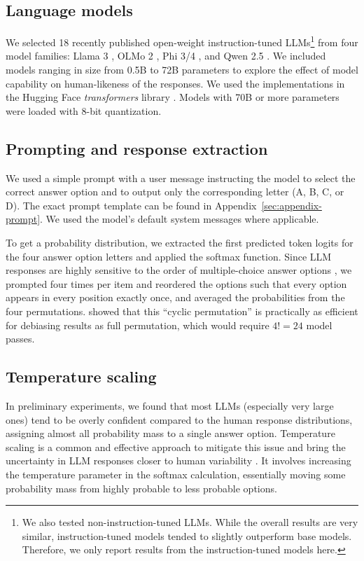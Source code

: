 \documentclass[11pt]{article}
\begin{document}
\subsection{Language models}

We selected 18 recently published open-weight instruction-tuned LLMs\footnote{We also tested non-instruction-tuned LLMs. While the overall results are very similar, instruction-tuned models tended to slightly outperform base models. Therefore, we only report results from the instruction-tuned models here.} from four model families: Llama 3 \citep{Grattafiori2024}, OLMo 2 \citep{OLMo2025}, Phi 3/4 \citep{Abdin2024,Abdin2024a}, and Qwen 2.5 \citep{Qwen2024}. We included models ranging in size from 0.5B to 72B parameters to explore the effect of model capability on human-likeness of the responses. We used the implementations in the Hugging Face \emph{transformers} library \citep{Wolf2020}. Models with 70B or more parameters were loaded with 8-bit quantization.

\subsection{Prompting and response extraction}

We used a simple prompt with a user message instructing the model to select the correct answer option and to output only the corresponding letter (A, B, C, or D). The exact prompt template can be found in Appendix~\ref{sec:appendix-prompt}. We used the model's default system messages where applicable.

To get a probability distribution, we extracted the first predicted token logits for the four answer option letters and applied the softmax function. Since LLM responses are highly sensitive to the order of multiple-choice answer options \citep{Wang2024,Zheng2024,Pezeshkpour2024}, we prompted four times per item and reordered the options such that every option appears in every position exactly once, and averaged the probabilities from the four permutations. \citet{Zheng2024} showed that this ``cyclic permutation'' is practically as efficient for debiasing results as full permutation, which would require $4! = 24$ model passes.

\subsection{Temperature scaling}
\label{sec:experiment:temperature-scaling}

In preliminary experiments, we found that most LLMs (especially very large ones) tend to be overly confident compared to the human response distributions, assigning almost all probability mass to a single answer option. Temperature scaling is a common and effective approach to mitigate this issue and bring the uncertainty in LLM responses closer to human variability \citep{Guo2017,Baan2022,Chen2024}. It involves increasing the temperature parameter in the softmax calculation, essentially moving some probability mass from highly probable to less probable options.
\end{document}
